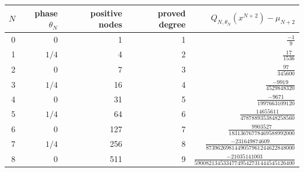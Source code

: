 \begin{tabular}{@{}rrrrr@{}}
\toprule
$N$ & phase $\theta_N$ & positive nodes & proved degree & $Q_{N,\theta_N}(x^{N+2})-\mu_{N+2}$\\
\midrule
0 & $0$ & 1 & 1 & $\frac{-1}{9}$\\
1 & $1/4$ & 4 & 2 & $\frac{17}{1536}$\\
2 & $0$ & 7 & 3 & $\frac{97}{345600}$\\
3 & $1/4$ & 16 & 4 & $\frac{-9919}{4529848320}$\\
4 & $0$ & 31 & 5 & $\frac{-9671}{1997663109120}$\\
5 & $1/4$ & 64 & 6 & $\frac{14655611}{4787889353848258560}$\\
6 & $0$ & 127 & 7 & $\frac{9903527}{18313676778469588992000}$\\
7 & $1/4$ & 256 & 8 & $\frac{-231649874609}{8739626981449057961244622848000}$\\
8 & $0$ & 511 & 9 & $\frac{-21035141003}{59008213453347749542731444545126400}$\\
\bottomrule
\end{tabular}
